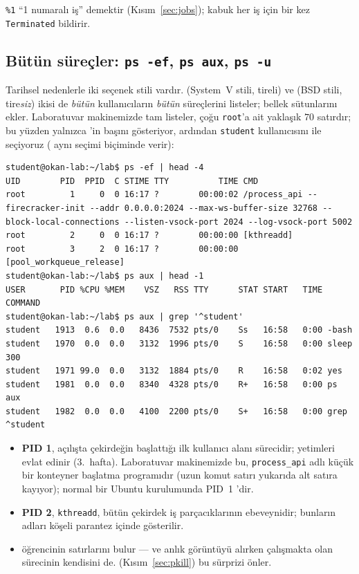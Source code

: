 \texttt{\%1} ``1 numaralı iş'' demektir (Kısım~\ref{sec:jobs}); kabuk her iş için bir kez \texttt{Terminated} bildirir.

\subsection{Bütün süreçler: \texttt{ps -ef}, \texttt{ps aux}, \texttt{ps -u}}

Tarihsel nedenlerle iki seçenek stili vardır.  (System~V stili, tireli) ve  (BSD stili, tire\emph{siz}) ikisi de \emph{bütün} kullanıcıların \emph{bütün} süreçlerini listeler;  bellek sütunlarını ekler. Laboratuvar makinemizde tam listeler, çoğu \texttt{root}'a ait yaklaşık $70$ satırdır; bu yüzden yalnızca 'in başını gösteriyor, ardından \texttt{student} kullanıcısını  ile seçiyoruz ( aynı seçimi  biçiminde verir):

\begin{lstlisting}[style=wterm]
student@okan-lab:~/lab$ ps -ef | head -4
UID        PID  PPID  C STIME TTY          TIME CMD
root         1     0  0 16:17 ?        00:00:02 /process_api --firecracker-init --addr 0.0.0.0:2024 --max-ws-buffer-size 32768 --block-local-connections --listen-vsock-port 2024 --log-vsock-port 5002
root         2     0  0 16:17 ?        00:00:00 [kthreadd]
root         3     2  0 16:17 ?        00:00:00 [pool_workqueue_release]
student@okan-lab:~/lab$ ps aux | head -1
USER       PID %CPU %MEM    VSZ   RSS TTY      STAT START   TIME COMMAND
student@okan-lab:~/lab$ ps aux | grep '^student'
student   1913  0.6  0.0   8436  7532 pts/0    Ss   16:58   0:00 -bash
student   1970  0.0  0.0   3132  1996 pts/0    S    16:58   0:00 sleep 300
student   1971 99.0  0.0   3132  1884 pts/0    R    16:58   0:02 yes
student   1981  0.0  0.0   8340  4328 pts/0    R+   16:58   0:00 ps aux
student   1982  0.0  0.0   4100  2200 pts/0    S+   16:58   0:00 grep ^student
\end{lstlisting}

\begin{itemize}
  \item \textbf{PID 1}, açılışta çekirdeğin başlattığı ilk kullanıcı alanı sürecidir; yetimleri evlat edinir (3.~hafta). Laboratuvar makinemizde bu, \texttt{process\_api} adlı küçük bir konteyner başlatma programıdır (uzun komut satırı yukarıda alt satıra kayıyor); normal bir Ubuntu kurulumunda PID~1 'dir.
  \item \textbf{PID 2}, \texttt{kthreadd}, bütün çekirdek iş parçacıklarının ebeveynidir; bunların adları köşeli parantez içinde gösterilir.
  \item {} öğrencinin satırlarını bulur --- ve  anlık görüntüyü alırken çalışmakta olan  sürecinin kendisini de.  (Kısım~\ref{sec:pkill}) bu sürprizi önler.
\end{itemize}

